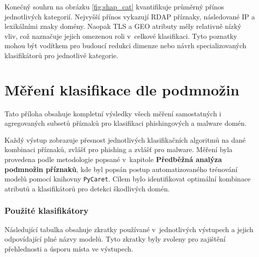Konečný souhrn na obrázku \ref{fig:shap_cat} kvantifikuje průměrný přínos jednotlivých kategorií. Nejvyšší přínos vykazují RDAP příznaky, následované IP a lexikálními znaky domény. Naopak TLS a GEO atributy měly relativně nízký vliv, což naznačuje jejich omezenou roli v~celkové klasifikaci. Tyto poznatky mohou být vodítkem pro budoucí redukci dimenze nebo návrh specializovaných klasifikátorů pro jednotlivé kategorie.










\chapter{Měření klasifikace dle podmnožin}
\label{sec:appendix-results}

Tato příloha obsahuje kompletní výsledky všech měření samostatných i agregovaných subsetů příznaků pro klasifikaci phishingových a malware domén.

Každý výstup zobrazuje přesnost jednotlivých klasifikačních algoritmů na dané kombinaci příznaků, zvlášť pro phishing a zvlášť pro malware. Měření byla provedena podle metodologie popsané v~kapitole \textbf{Předběžná analýza podmnožin příznaků}, kde byl popsán postup automatizovaného trénování modelů pomocí knihovny \texttt{PyCaret}. Cílem bylo identifikovat optimální kombinace atributů a klasifikátorů pro detekci škodlivých domén.

\subsection*{Použité klasifikátory}

Následující tabulka obsahuje zkratky používané v~jednotlivých výstupech a jejich odpovídající plné názvy modelů. Tyto zkratky byly zvoleny pro zajištění přehlednosti a úsporu místa ve výstupech.

